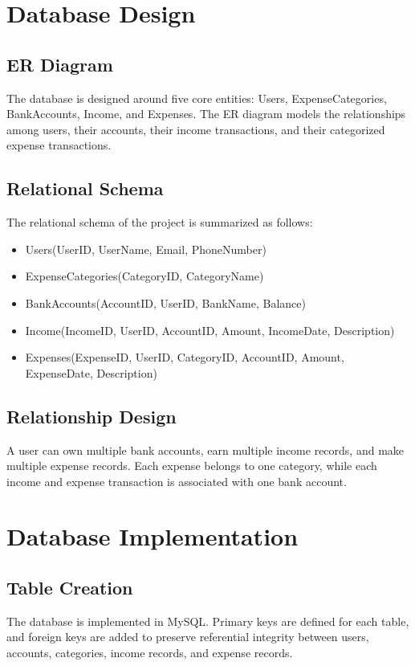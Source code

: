 \section{Database Design}

\subsection{ER Diagram}
The database is designed around five core entities: Users, ExpenseCategories, BankAccounts, Income, and Expenses. The ER diagram models the relationships among users, their accounts, their income transactions, and their categorized expense transactions.

\subsection{Relational Schema}
The relational schema of the project is summarized as follows:
\begin{itemize}
    \item Users(UserID, UserName, Email, PhoneNumber)
    \item ExpenseCategories(CategoryID, CategoryName)
    \item BankAccounts(AccountID, UserID, BankName, Balance)
    \item Income(IncomeID, UserID, AccountID, Amount, IncomeDate, Description)
    \item Expenses(ExpenseID, UserID, CategoryID, AccountID, Amount, ExpenseDate, Description)
\end{itemize}

\subsection{Relationship Design}
A user can own multiple bank accounts, earn multiple income records, and make multiple expense records. Each expense belongs to one category, while each income and expense transaction is associated with one bank account.

\section{Database Implementation}

\subsection{Table Creation}
The database is implemented in MySQL. Primary keys are defined for each table, and foreign keys are added to preserve referential integrity between users, accounts, categories, income records, and expense records.


